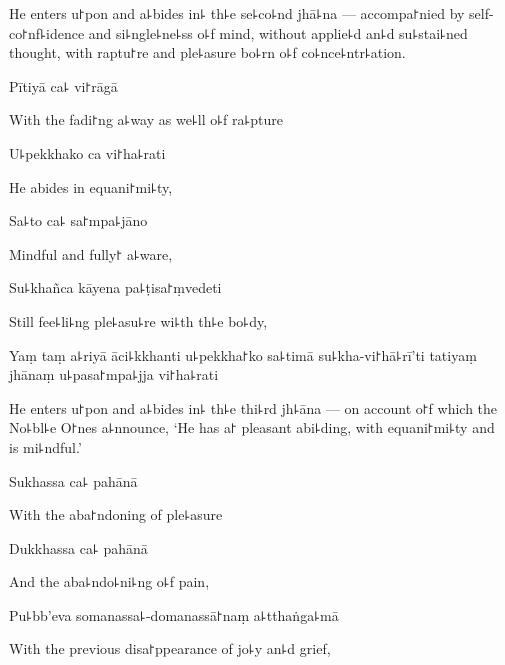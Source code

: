 \begin{english}
  He enters u꜓pon and a꜕bides in꜕ th꜕e se꜕co꜕nd jhā꜕na --- accompa꜓nied
  by self-co꜓nf꜕idence and si꜕ngle꜕ne꜕ss o꜕f mind, without applie꜕d an꜕d
  su꜕stai꜕ned thought, with raptu꜓re and ple꜕asure bo꜕rn o꜕f
  co꜕nce꜕ntr꜕ation.
\end{english}

\clearpage

Pītiyā ca꜕ vi꜓rāgā

\begin{english}
  With the fadi꜓ng a꜕way as we꜕ll o꜕f ra꜕pture
\end{english}

U꜕pekkhako ca vi꜓ha꜕rati

\begin{english}
  He abides in equani꜓mi꜕ty,
\end{english}

Sa꜕to ca꜕ sa꜓mpa꜕jāno

\begin{english}
  Mindful and fully꜓ a꜕ware,
\end{english}

Su꜕khañca kāyena pa꜕ṭisa꜓ṃvedeti

\begin{english}
  Still fee꜕li꜕ng ple꜕asu꜕re wi꜕th th꜕e bo꜕dy,
\end{english}

Yaṃ taṃ a꜕riyā āci꜕kkhanti u꜕pekkha꜓ko sa꜕timā su꜕kha-vi꜓hā꜕rī'ti tatiyaṃ jhānaṃ u꜕pasa꜓mpa꜕jja vi꜓ha꜕rati

\begin{english}
  He enters u꜓pon and a꜕bides in꜕ th꜕e thi꜕rd jh꜕āna --- on account o꜓f
  which the No꜕bl꜕e O꜓nes a꜕nnounce, `He has a꜓ pleasant abi꜕ding, with
  equani꜓mi꜕ty and\\ is mi꜕ndful.'
\end{english}

Sukhassa ca꜕ pahānā

\begin{english}
  With the aba꜓ndoning of ple꜕asure
\end{english}

Dukkhassa ca꜕ pahānā

\begin{english}
  And the aba꜕ndo꜕ni꜕ng o꜕f pain,
\end{english}

Pu꜕bb'eva somanassa꜕-domanassā꜓naṃ a꜕tthaṅga꜕mā

\begin{english}
  With the previous disa꜓ppearance of jo꜕y an꜕d grief,
\end{english}

